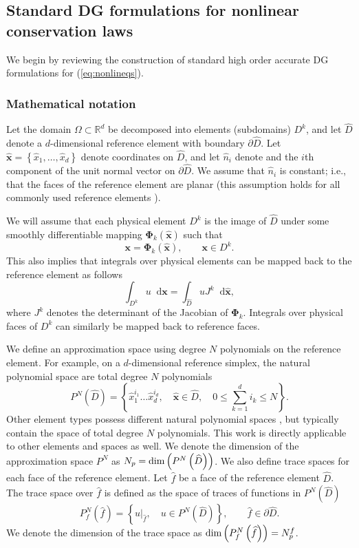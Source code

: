 \documentclass[10pt]{amsart}
\theoremstyle{definition}
\theoremstyle{lemma}
\theoremstyle{theorem}
\theoremstyle{assumption}
\renewcommand{\hat}{\widehat}
\newcommand{\LRp}[1]{\left( #1 \right)}
\newcommand{\LRc}[1]{\left\{ #1 \right\}}
\newcommand*\diff[1]{\mathop{}\!{\mathrm{d}#1}} %
\begin{document}
\subsection{Standard DG formulations for nonlinear conservation laws}

We begin by reviewing the construction of standard high order accurate DG formulations for (\ref{eq:nonlineqs}).  

\subsubsection{Mathematical notation}

Let the domain $\Omega \subset \mathbb{R}^d$ be decomposed into elements (subdomains) $D^k$, and let $\hat{D}$ denote a $d$-dimensional reference element with boundary $\partial \hat{D}$.  Let $\hat{\bm{x}} = \LRc{\hat{x}_1,\ldots,\hat{x}_d}$ denote coordinates on $\hat{D}$, and let $\hat{n}_i$ denote and the $i$th component of the unit normal vector on $\partial \hat{D}$.  We assume that $\hat{n}_i$ is constant; i.e., that the faces of the reference element are planar (this assumption holds for all commonly used reference elements \cite{chan2015gpu}).  

We will assume that each physical element $D^k$ is the image of $\hat{D}$ under some smoothly differentiable mapping $\bm{\Phi}_k(\hat{\bm{x}})$ such that
\[
\bm{x} = \bm{\Phi}_k(\hat{\bm{x}}), \qquad \bm{x}\in D^k.
\]
This also implies that integrals over physical elements can be mapped back to the reference element as follows
\[
\int_{D^k} u \diff{\bm{x}} = \int_{\hat{D}} u J^k\diff{\hat{\bm{x}}}, 
\]
where $J^k$ denotes the determinant of the Jacobian of $\bm{\Phi}_k$.  Integrals over physical faces of $D^k$ can similarly be mapped back to reference faces.


We define an approximation space using degree $N$ polynomials on the reference element.  For example, on a $d$-dimensional reference simplex, the natural polynomial space are total degree $N$ polynomials 
\[
P^N\LRp{\widehat{D}} = \LRc{\hat{x}_1^{i_1}\ldots\hat{x}_d^{i_d}, \quad \hat{\bm{x}} \in \widehat{D}, \quad 0\leq \sum_{k=1}^d i_k \leq N}.
\]
Other element types possess different natural polynomial spaces \cite{chan2015gpu}, but typically contain the space of total degree $N$ polynomials.  This work is directly applicable to other elements and spaces as well.  We denote the dimension of the approximation space $P^N$ as $N_p = {\rm dim}\LRp{P^N\LRp{\widehat{D}}}$.  We also define trace spaces for each face of the reference element.  Let $\hat{f}$ be a face of the reference element $\hat{D}$.  The trace space over $\hat{f}$ is defined as the space of traces of functions in $P^N\LRp{\hat{D}}$
\[
P^N_f \LRp{\hat{f}} = \LRc{ \left.u\right|_{\hat{f}}, \quad u \in P^N\LRp{\hat{D}}}, \qquad \hat{f}\in \partial\hat{D}.
\]
We denote the dimension of the trace space as ${\rm dim}\LRp{P^N_f\LRp{\hat{f}}} = N^f_p$.
\end{document}
